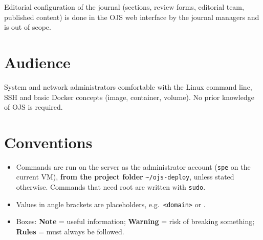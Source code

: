 \documentclass[11pt,a4paper]{report}
\newcommand{\code}[1]{\texttt{\small #1}}
\newcommand{\file}[1]{\texttt{\small #1}}
\begin{document}
Editorial configuration of the journal (sections, review forms, editorial team, published
content) is done in the OJS web interface by the journal managers and is out of scope.

\section{Audience}
System and network administrators comfortable with the Linux command line, SSH and basic
Docker concepts (image, container, volume). No prior knowledge of OJS is required.

\section{Conventions}
\begin{itemize}
  \item Commands are run on the server as the administrator account (\code{spe} on the current
        VM), \textbf{from the project folder} \file{\textasciitilde/ojs-deploy}, unless stated otherwise.
        Commands that need root are written with \code{sudo}.
  \item Values in angle brackets are placeholders, e.g.\ \code{<domain>} or \code{<server-ip>}.
  \item Boxes: \textcolor{esiblue}{\textbf{Note}} = useful information;
        \textcolor{warnrule}{\textbf{Warning}} = risk of breaking something;
        \textcolor{rulerule}{\textbf{Rules}} = must always be followed.
\end{itemize}
\end{document}
